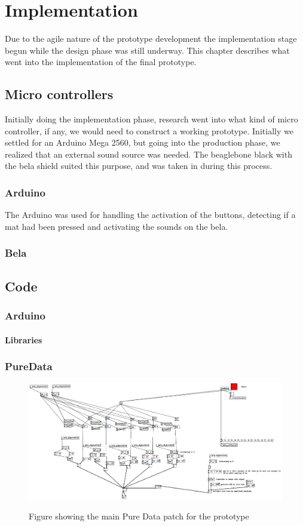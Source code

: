 \chapter{Implementation}%
Due to the agile nature of the prototype development the implementation stage begun while the design phase was still underway. This chapter describes what went into the implementation of the final prototype.

\section{Micro controllers}%
	Initially doing the implementation phase, research went into what kind of micro controller, if any, we would need to construct a working prototype. Initially we settled for an Arduino Mega 2560, but going into the production phase, we realized that an external sound source was needed. The beaglebone black with the bela shield suited this purpose, and was taken in during this process.
	\subsection{Arduino}%
		The Arduino was used for handling the activation of the buttons, detecting if a mat had been pressed and activating the sounds on the bela. 
		
	\subsection{Bela}%
		
	
\section{Code}
	\subsection{Arduino}%
		\subsubsection{Libraries}%
	\subsection{PureData}%
	\begin{figure}[H]
		\centering
		\includegraphics[width=1\linewidth]{figure/Implementation/pdPatch}
		\label{fig:pdPatch}
		\caption{Figure showing the main Pure Data patch for the prototype}
	\end{figure}	
	
